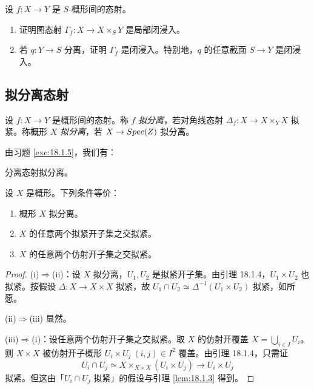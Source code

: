 \begin{exercise}\label{exc:18.2.11}
设 $f:X\to Y$ 是 $S$-概形间的态射。
\begin{enumerate}[label=(\roman*),leftmargin=2em,itemsep=0.25ex]
  \item 证明图态射 $\Gamma_f:X\to X\times_S Y$ 是局部闭浸入。
  \item 若 $q:Y\to S$ 分离，证明 $\Gamma_f$ 是闭浸入。特别地，$q$ 的任意截面 $S\to Y$ 是闭浸入。
\end{enumerate}
\end{exercise}

\subsection{拟分离态射}\label{sec:18.3}

\begin{definition}\label{def:18.3.1}
设 $f:X\to Y$ 是概形间的态射。称 $f$ \emph{拟分离}，若对角线态射 $\Delta_f:X\to X\times_Y X$ 拟紧。称概形 $X$ \emph{拟分离}，若 $X\to Spec(Z)$ 拟分离。
\end{definition}

由习题 \ref{exc:18.1.5}，我们有：

\begin{corollary}\label{cor:18.3.2}
分离态射拟分离。
\end{corollary}

\begin{lemma}\label{lem:18.3.3}
设 $X$ 是概形。下列条件等价：
\begin{enumerate}[label=(\roman*),leftmargin=2em,itemsep=0.25ex]
  \item 概形 $X$ 拟分离。
  \item $X$ 的任意两个拟紧开子集之交拟紧。
  \item $X$ 的任意两个仿射开子集之交拟紧。
\end{enumerate}
\end{lemma}

\begin{proof}
(i)$\Rightarrow$(ii)：设 $X$ 拟分离，$U_1,U_2$ 是拟紧开子集。由引理 18.1.4，$U_1\times U_2$ 也拟紧。按假设 $\Delta:X\to X\times X$ 拟紧，故 $U_1\cap U_2\simeq\Delta^{-1}(U_1\times U_2)$ 拟紧，如所愿。

(ii)$\Rightarrow$(iii) 显然。

(iii)$\Rightarrow$(i)：设任意两个仿射开子集之交拟紧。取 $X$ 的仿射开覆盖 $X=\bigcup_{i\in I}U_i$。则 $X\times X$ 被仿射开子概形 $U_i\times U_j\ (i,j)\in I^2$ 覆盖。由引理 18.1.4，只需证
\[
U_i\cap U_j\simeq X\times_{X\times X}(U_i\times U_j)\to U_i\times U_j
\]
拟紧。但这由「$U_i\cap U_j$ 拟紧」的假设与引理 \ref{lem:18.1.3} 得到。
\end{proof}


